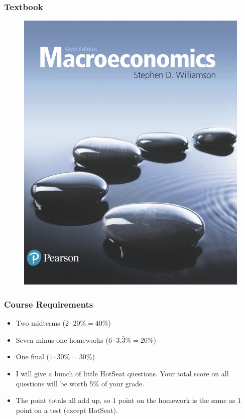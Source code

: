 \documentclass{beamer}
\begin{document}
\begin{frame}
\frametitle[alignment=center]{Textbook}
\begin{figure}
\centering
\includegraphics[scale=0.3]{Williamson.png}
\end{figure}
\end{frame}

\begin{frame}
\frametitle[alignment=center]{Course Requirements}
\begin{itemize}
\item Two midterms ($2\cdot20\%=40\%$)
\bigskip
\item Seven minus one homeworks ($6\cdot3.\bar{3}\%=20\%$)
\bigskip
\item One final ($1\cdot30\%=30\%$)
\bigskip
\item I will give a bunch of little HotSeat questions.  Your total score on all questions will be worth 5\% of your grade.
\bigskip
\item The point totals all add up, so 1 point on the homework is the same as 1 point on a test (except HotSeat).  
\end{itemize}
\end{frame}
\end{document}
